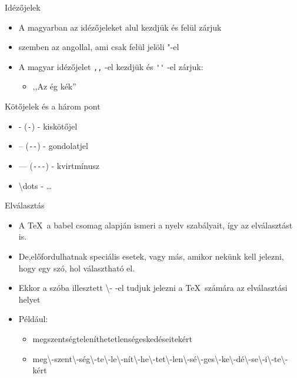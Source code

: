 \documentclass[11pt]{beamer}
\newcommand{\tbs}{\textbackslash}
\begin{document}
\begin{frame}[fragile=singleslide]{Idézőjelek}
\begin{itemize}

\item	A magyarban az idézőjeleket alul kezdjük és felül zárjuk
\item 	szemben az angollal, ami csak felül jelöli "-el
\item	A magyar idézőjelet  \verb+,,+ -el kezdjük és \verb+''+ -el zárjuk:
		\begin{itemize}
		\item ,,Az ég kék''
		\end{itemize}
\end{itemize}
\end{frame}

\begin{frame}[fragile=singleslide]{Kötőjelek és a három pont}
\begin{itemize}
\item	- (\verb+-+) - kiskötőjel 
\item	-- (\verb+--+) - gondolatjel
\item 	--- (\verb+---+) - kvirtmínusz
\item	\tbs dots - \dots
\end{itemize}
\end{frame}

\begin{frame}{Elválasztás}
\begin{itemize}
\item	A \TeX \ a babel csomag alapján ismeri a nyelv szabályait, így az elválasztást is.
\item	De,előfordulhatnak speciális esetek, vagy más, amikor nekünk kell jelezni, hogy egy szó, hol választható el.
\item	Ekkor a szóba illesztett \tbs - -el tudjuk jelezni a \TeX \ számára az elválasztási helyet
\item	Például:
		\begin{itemize}
		\item megszentségteleníthetetlenségeskedéseitekért
		\item meg\tbs -szent\tbs -ség\tbs -te\tbs -le\tbs -nít\tbs -he\tbs -tet\tbs -len\tbs -sé\tbs -ges\tbs -ke\tbs -dé\tbs -se\tbs -i\tbs -te\tbs -kért
		\end{itemize}
\end{itemize}
\end{frame}
\end{document}
